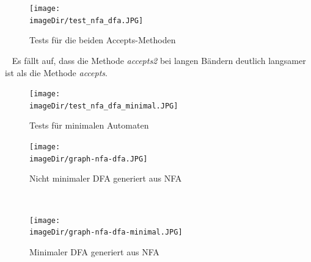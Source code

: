 \documentclass[11pt, a4paper, twoside]{article}   	%
\newcommand{\imageDir}{images}
\begin{document}
\begin{figure}[h]
\centering
\texttt{[image: \\imageDir/test\_nfa\_dfa.JPG]}
\caption{Tests für die beiden Accepts-Methoden}
\label{fig:test-nfa-dfa}
\end{figure}
\ \newline
Es fällt auf, dass die Methode \emph{accepts2} bei langen Bändern deutlich langsamer ist als die Methode \emph{accepts}.
\newpage

\begin{figure}[h]
\centering
\texttt{[image: \\imageDir/test\_nfa\_dfa\_minimal.JPG]}
\caption{Tests für minimalen Automaten}
\label{fig:test-nfa-dfa-minimal}
\end{figure}

\begin{figure}[h]
\centering
\texttt{[image: \\imageDir/graph-nfa-dfa.JPG]}
\caption{Nicht minimaler DFA generiert aus NFA}
\label{fig:graph-nfa-dfa}
\end{figure}
\ \newpage

\begin{figure}[h]
\centering
\texttt{[image: \\imageDir/graph-nfa-dfa-minimal.JPG]}
\caption{Minimaler DFA generiert aus NFA}
\label{fig:graph-nfa-dfa}
\end{figure}
\end{document}

